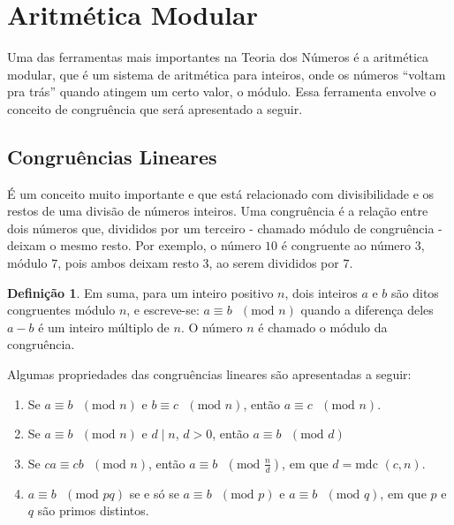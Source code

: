 \documentclass[14pt, oneside]{book}
\newcommand\tab[1][1cm]{\hspace*{#1}}
\theoremstyle{definition}
\newtheorem{defn}{Definição}
\begin{document}
            \section{Aritmética Modular}
                \tab Uma das ferramentas mais importantes na Teoria dos Números é a aritmética modular, que é um sistema de aritmética para inteiros, onde os números ``voltam pra trás'' quando atingem um certo valor, o módulo. Essa ferramenta envolve o conceito de congruência que será apresentado a seguir.
                    
                \subsection{Congruências Lineares}
                    \tab É um conceito muito importante e que está relacionado com divisibilidade e os restos de uma divisão de números inteiros. Uma congruência é a relação entre dois números que, divididos por um terceiro - chamado módulo de congruência - deixam o mesmo resto. Por exemplo, o número $10$ é congruente ao número $3$, módulo $7$, pois ambos deixam resto $3$, ao serem divididos por $7$.
                    \begin{defn}Em suma, para um inteiro positivo $n$, dois inteiros $a$ e $b$ são ditos congruentes módulo $n$, e escreve-se: $a\equiv b \textrm{ }(\textrm{mod } n)$ quando a diferença deles $a - b$ é um inteiro múltiplo de $n$. O número $n$ é chamado o módulo da congruência.
                    \end{defn}
                    \tab Algumas propriedades das congruências lineares são apresentadas a seguir:
                    \begin{enumerate}[label=(\roman*)]
                        \item Se $a\equiv b \textrm{ }(\textrm{mod } n)$ e $b\equiv c \textrm{ }(\textrm{mod } n)$, então $a\equiv c \textrm{ }(\textrm{mod } n)$.
                        \item Se $a\equiv b \textrm{ }(\textrm{mod } n)$ e $d \mid n$, $d>0$, então $a\equiv b \textrm{ }(\textrm{mod } d)$
                        \item Se $ca\equiv cb \textrm{ }(\textrm{mod } n)$, então $a\equiv b \textrm{ }(\textrm{mod } \frac{n}{d})$, em que $d = \textrm{mdc }(c,n)$.
                        \item $a\equiv b \textrm{ }(\textrm{mod } pq)$ se e só se $a\equiv b \textrm{ }(\textrm{mod } p)$ e $a\equiv b \textrm{ }(\textrm{mod } q)$, em que $p$ e $q$ são primos distintos.
                    \end{enumerate}
                
\end{document}
